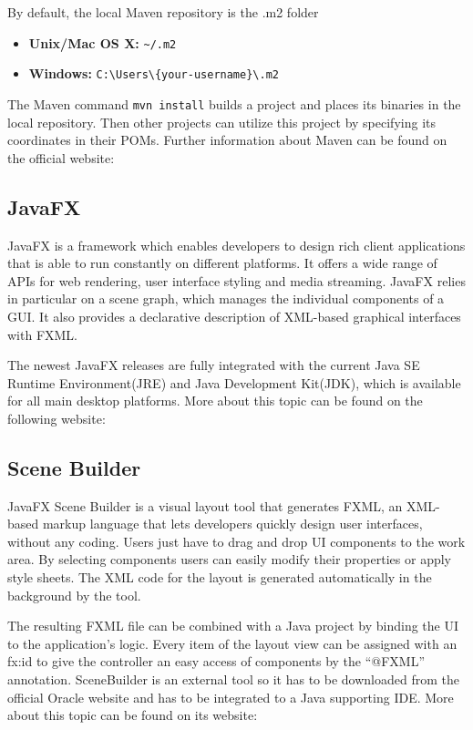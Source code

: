 By default, the local Maven repository is the .m2 folder
\begin{itemize}
\item \textbf{Unix/Mac OS X: }\lstinline$~/.m2$
\item \textbf{Windows: }\lstinline$C:\Users\{your-username}\.m2$
\end{itemize}

The Maven command \lstinline$mvn install$ builds a project and places its binaries in the local repository. Then other projects can utilize this project by specifying its coordinates in their POMs. Further information about Maven can be found on the official website: \cite{maven_maven_nodate}

\subsection{JavaFX}
JavaFX is a framework which enables developers to design rich client applications that is able to run constantly on different platforms. It offers a wide range of APIs for web rendering, user interface styling and media streaming. JavaFX relies in particular on a scene graph, which manages the individual components of a GUI. It also provides a declarative description of XML-based graphical interfaces with FXML.

The newest JavaFX releases are fully integrated with the current Java SE Runtime Environment(JRE) and Java Development Kit(JDK), which is available for all main desktop platforms. 
More about this topic can be found on the following website: \cite{javafx_main_nodate}

\subsection{Scene Builder} \label{sec:SceneBuilder}
JavaFX Scene Builder is a visual layout tool that generates FXML, an XML-based markup language that lets developers quickly design user interfaces, without any coding. Users just have to drag and drop UI components to the work area. By selecting components users can easily modify their properties or apply style sheets. The XML code for the layout is generated automatically in the background by the tool.

The resulting FXML file can be combined with a Java project by binding the UI to the application’s logic. Every item of the layout view can be assigned with an fx:id to give the controller an easy access of components by the ``@FXML'' annotation. SceneBuilder is an external tool so it has to be downloaded from the official Oracle website and has to be integrated to a Java supporting IDE. 
More about this topic can be found on its website: \cite{scenebuilder_javafx_nodate}

